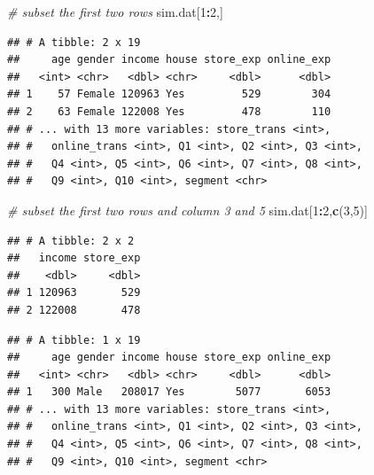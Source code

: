 \documentclass[12pt,]{krantz}
\newenvironment{Shaded}{\begin{snugshade}}{\end{snugshade}}
\newcommand{\KeywordTok}[1]{\textcolor[rgb]{0.13,0.29,0.53}{\textbf{#1}}}
\newcommand{\DecValTok}[1]{\textcolor[rgb]{0.00,0.00,0.81}{#1}}
\newcommand{\CommentTok}[1]{\textcolor[rgb]{0.56,0.35,0.01}{\textit{#1}}}
\newcommand{\OperatorTok}[1]{\textcolor[rgb]{0.81,0.36,0.00}{\textbf{#1}}}
\newcommand{\NormalTok}[1]{#1}
\theoremstyle{definition}
\theoremstyle{definition}
\theoremstyle{definition}
\theoremstyle{remark}
\begin{document}
\begin{Shaded}
\begin{Highlighting}[]
\CommentTok{# subset the first two rows}
\NormalTok{sim.dat[}\DecValTok{1}\OperatorTok{:}\DecValTok{2}\NormalTok{,]}
\end{Highlighting}
\end{Shaded}

\begin{verbatim}
## # A tibble: 2 x 19
##     age gender income house store_exp online_exp
##   <int> <chr>   <dbl> <chr>     <dbl>      <dbl>
## 1    57 Female 120963 Yes         529        304
## 2    63 Female 122008 Yes         478        110
## # ... with 13 more variables: store_trans <int>,
## #   online_trans <int>, Q1 <int>, Q2 <int>, Q3 <int>,
## #   Q4 <int>, Q5 <int>, Q6 <int>, Q7 <int>, Q8 <int>,
## #   Q9 <int>, Q10 <int>, segment <chr>
\end{verbatim}

\begin{Shaded}
\begin{Highlighting}[]
\CommentTok{# subset the first two rows and column 3 and 5}
\NormalTok{sim.dat[}\DecValTok{1}\OperatorTok{:}\DecValTok{2}\NormalTok{,}\KeywordTok{c}\NormalTok{(}\DecValTok{3}\NormalTok{,}\DecValTok{5}\NormalTok{)]}
\end{Highlighting}
\end{Shaded}

\begin{verbatim}
## # A tibble: 2 x 2
##   income store_exp
##    <dbl>     <dbl>
## 1 120963       529
## 2 122008       478
\end{verbatim}

\begin{Shaded}
\end{Shaded}

\begin{verbatim}
## # A tibble: 1 x 19
##     age gender income house store_exp online_exp
##   <int> <chr>   <dbl> <chr>     <dbl>      <dbl>
## 1   300 Male   208017 Yes        5077       6053
## # ... with 13 more variables: store_trans <int>,
## #   online_trans <int>, Q1 <int>, Q2 <int>, Q3 <int>,
## #   Q4 <int>, Q5 <int>, Q6 <int>, Q7 <int>, Q8 <int>,
## #   Q9 <int>, Q10 <int>, segment <chr>
\end{verbatim}
\end{document}
